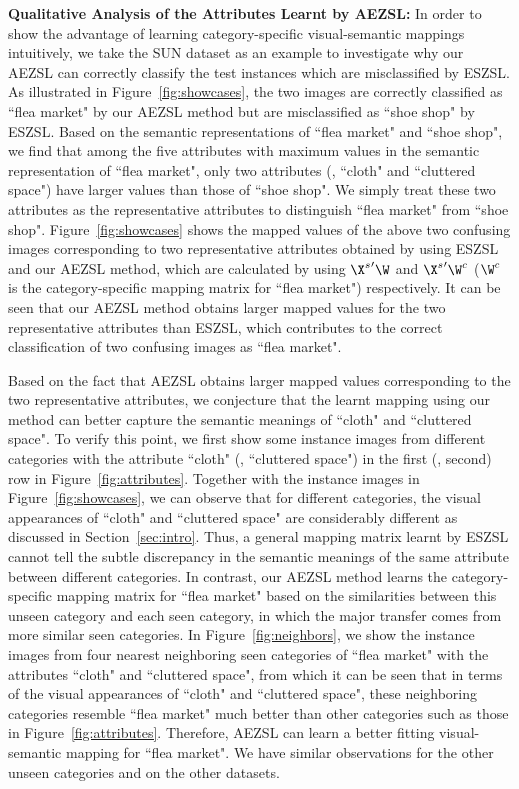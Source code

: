 \documentclass[journal]{IEEEtran}
\begin{document}
\noindent\textbf{Qualitative Analysis of the Attributes Learnt by AEZSL:} In order to show the advantage of learning category-specific visual-semantic mappings intuitively, we take the SUN dataset as an example to investigate why our AEZSL can correctly classify the test instances which are misclassified by ESZSL. As illustrated in Figure~\ref{fig:showcases}, the two images are correctly classified as ``flea market" by our AEZSL method but are misclassified as ``shoe shop" by ESZSL. Based on the semantic representations of ``flea market" and ``shoe shop", we find that among the five attributes with maximum values in the semantic representation of ``flea market", only two attributes (\ie, ``cloth" and ``cluttered space") have larger values than those of ``shoe shop". We simply treat these two attributes as the representative attributes to distinguish ``flea market" from ``shoe shop". Figure~\ref{fig:showcases} shows the mapped values of the above two confusing images corresponding to two representative attributes obtained by using ESZSL and our AEZSL method, which are calculated by using ${\X^s}'\W$ and ${\X^s}'\W^c$ ($\W^c$ is the category-specific mapping matrix for ``flea market") respectively. It can be seen that our AEZSL method obtains larger mapped values for the two representative attributes than ESZSL, which contributes to the correct classification of two confusing images as ``flea market".

Based on the fact that AEZSL obtains larger mapped values corresponding to the two representative attributes, we conjecture that the learnt mapping using our method can better capture the semantic meanings of ``cloth" and ``cluttered space". To verify this point, we first show some instance images from different categories with the attribute ``cloth" (\resp, ``cluttered space") in the first (\resp, second) row in Figure~\ref{fig:attributes}. Together with the instance images in Figure~\ref{fig:showcases}, we can observe that for different categories, the visual appearances of ``cloth" and ``cluttered space" are considerably different as discussed in Section~\ref{sec:intro}. Thus, a general mapping matrix learnt by ESZSL cannot tell the subtle discrepancy in the semantic meanings of the same attribute between different categories. In contrast, our AEZSL method learns the category-specific mapping matrix for ``flea market" based on the similarities between this unseen category and each seen category, in which the major transfer comes from more similar seen categories. In Figure~\ref{fig:neighbors}, we show the instance images from four nearest neighboring seen categories of ``flea market" with the attributes ``cloth" and ``cluttered space", from which it can be seen that in terms of the visual appearances of ``cloth" and ``cluttered space", these neighboring categories resemble  ``flea market" much better than other categories such as those in Figure~\ref{fig:attributes}. Therefore, AEZSL can learn a better fitting visual-semantic mapping for ``flea market". We have similar observations for the other unseen categories and on the other datasets.
\end{document}
